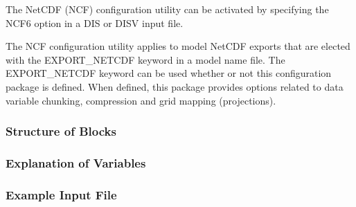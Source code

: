 The NetCDF (NCF) configuration utility can be activated by specifying the NCF6 option in a DIS or DISV input file.

The NCF configuration utility applies to model NetCDF exports that are elected with the EXPORT\_NETCDF keyword in a model name file. The EXPORT\_NETCDF keyword can be used whether or not this configuration package is defined. When defined, this package provides options related to data variable chunking, compression and grid mapping (projections).

\subsubsection{Structure of Blocks}



\vspace{5mm}

\subsubsection{Explanation of Variables}
\begin{description}

\end{description}
\vspace{5mm}

\subsubsection{Example Input File}

